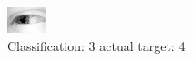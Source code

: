 \begin{figure}[h!]
\begin{center}
\includegraphics[width=0.60\columnwidth]{figures/ID2544_class_3_target_4.png}
\end{center}
\caption{ Classification: 3 actual target: 4}
\label{fig:ID2544_class_3_target_4}
\end{figure}
